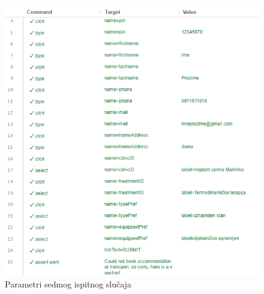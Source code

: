 			\begin{figure}[H]
				\centering
				\includegraphics[width=\textwidth]{"slike/Selenium/pacijent testovi/registerPatientGood_parameters.png"}
				\caption{Parametri sedmog ispitnog slučaja}
				\label{fig: registerPatientGood_parameters}
			\end{figure}
